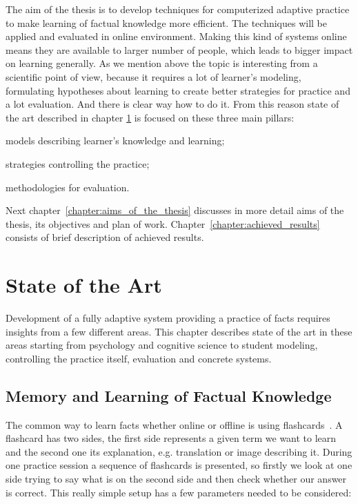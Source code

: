 \documentclass[table,color,cover,twoside,nolot,nolof]{fithesis3/fithesis3}
\begin{document}
The aim of the thesis is to develop techniques for computerized adaptive
practice to make learning of factual knowledge more efficient. The techniques
will be applied and evaluated in online environment. Making this kind of
systems online means they are available to larger number of people, which leads
to bigger impact on learning generally. As we mention above the topic is
interesting from a scientific point of view, because it requires a lot of
learner's modeling, formulating hypotheses about learning to create better
strategies for practice and a lot evaluation. And there is clear way how to do
it. From this reason state of the art described in chapter
\ref{chapter:state_of_the_art} is focused on these three main pillars:
\begin{enumerate*}[label=(\arabic*)]
	\item models describing learner's knowledge and learning;
	\item strategies controlling the practice;
	\item methodologies for evaluation.
\end{enumerate*}
Next chapter~\ref{chapter:aims_of_the_thesis} discusses in more detail aims of
the thesis, its objectives and plan of work.
Chapter~\ref{chapter:achieved_results} consists of brief description of achieved
results.

\chapter{State of the Art}
\label{chapter:state_of_the_art}

Development of a fully adaptive system providing a practice of facts requires
insights from a few different areas. This chapter describes state of the art in
these areas starting from psychology and cognitive science to student
modeling, controlling the practice itself, evaluation and concrete systems.

\section{Memory and Learning of Factual Knowledge}
\label{section:models}

The common way to learn facts whether online or offline is using
flashcards~\cite{kornell2008optimising}. A flashcard has two sides, the first
side represents a given term we want to learn and the second one its
explanation, e.g. translation or image describing it.  During one practice
session a sequence of flashcards is presented, so firstly we look at one side
trying to say what is on the second side and then check whether our answer is
correct. This really simple setup has a few parameters needed to be considered:
\end{document}

